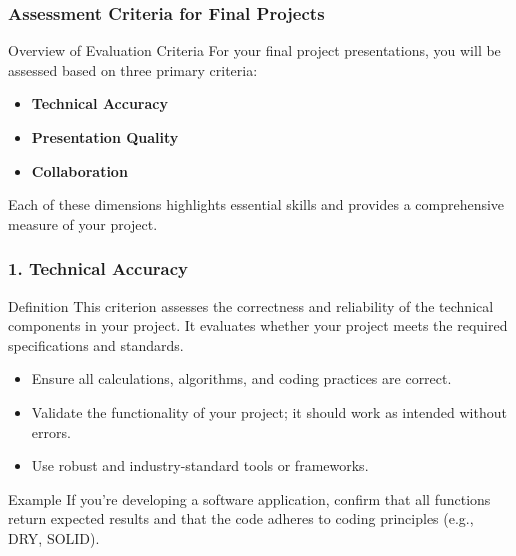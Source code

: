 \documentclass[aspectratio=169]{beamer}
\begin{document}
\begin{frame}[fragile]
    \frametitle{Assessment Criteria for Final Projects}
    
    \begin{block}{Overview of Evaluation Criteria}
        For your final project presentations, you will be assessed based on three primary criteria:
        \begin{itemize}
            \item \textbf{Technical Accuracy}
            \item \textbf{Presentation Quality}
            \item \textbf{Collaboration}
        \end{itemize}
        Each of these dimensions highlights essential skills and provides a comprehensive measure of your project.
    \end{block}
\end{frame}

\begin{frame}[fragile]
    \frametitle{1. Technical Accuracy}
    
    \begin{block}{Definition}
        This criterion assesses the correctness and reliability of the technical components in your project. It evaluates whether your project meets the required specifications and standards.
    \end{block}
    
    \begin{itemize}
        \item Ensure all calculations, algorithms, and coding practices are correct.
        \item Validate the functionality of your project; it should work as intended without errors.
        \item Use robust and industry-standard tools or frameworks.
    \end{itemize}
    
    \begin{exampleblock}{Example}
        If you’re developing a software application, confirm that all functions return expected results and that the code adheres to coding principles (e.g., DRY, SOLID).
    \end{exampleblock}
\end{frame}
\end{document}
